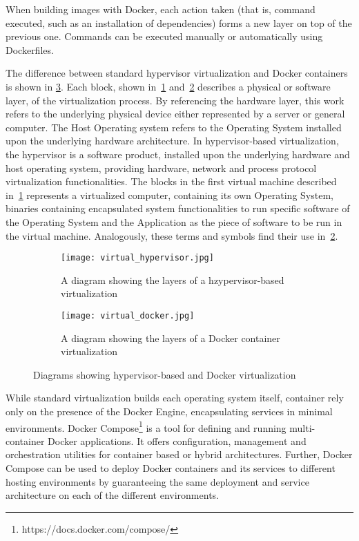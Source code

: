 \documentclass[
a4paper,
twoside,
headsepline,
cleardoublepage=empty,
parskip=half,
draft=false
]{scrbook}
\begin{document}
			When building images with Docker, each action taken (that is, command executed, such as an installation of dependencies) forms a new layer on top of the previous one. 
			Commands can be executed manually or automatically using Dockerfiles.
			
			The difference between standard hypervisor virtualization and Docker containers is shown in \cref{fig:virtualization}.
			Each block, shown in~\cref{subfig:hypervisor} and~\cref{subfig:docker} describes a physical or software layer, of the virtualization process. 
			By referencing the hardware layer, this work refers to the underlying physical device either represented by a server or general computer. 
			The Host Operating system refers to the Operating System installed upon the underlying hardware architecture.
			In hypervisor-based virtualization, the hypervisor is a software product, installed upon the underlying hardware and host operating system, providing hardware, network and process protocol virtualization functionalities.
			The blocks in the first virtual machine described in~\cref{subfig:hypervisor} represents a virtualized computer, containing its own Operating System, binaries containing encapsulated system functionalities to run specific software of the Operating System and the Application as the piece of software to be run in the virtual machine.
			Analogously, these terms and symbols find their use in~\cref{subfig:docker}.
			
			\begin{figure}[H]
				\centering
				\begin{subfigure}{0.45\textwidth}
					\centering
					\texttt{[image: virtual\_hypervisor.jpg]}
					\caption{A diagram showing the layers of a hzypervisor-based virtualization}
					\label{subfig:hypervisor}
				\end{subfigure}
				\hfill
				\begin{subfigure}{0.45\textwidth}
					\centering
					\texttt{[image: virtual\_docker.jpg]}
					\caption{A diagram showing the layers of a Docker container virtualization}
					\label{subfig:docker}
				\end{subfigure}
				\caption{Diagrams showing hypervisor-based and Docker virtualization}
				\label{fig:virtualization}
			\end{figure}
			
			While standard virtualization builds each operating system itself, container rely only on the presence of the Docker Engine, encapsulating services in minimal environments.
			Docker Compose\footnote{https://docs.docker.com/compose/} is a tool for defining and running multi-container Docker applications. It offers configuration, management and orchestration utilities for container based or hybrid architectures. Further, Docker Compose can be used to deploy Docker containers and its services to different hosting environments by guaranteeing the same deployment and service architecture on each of the different environments.
\end{document}
